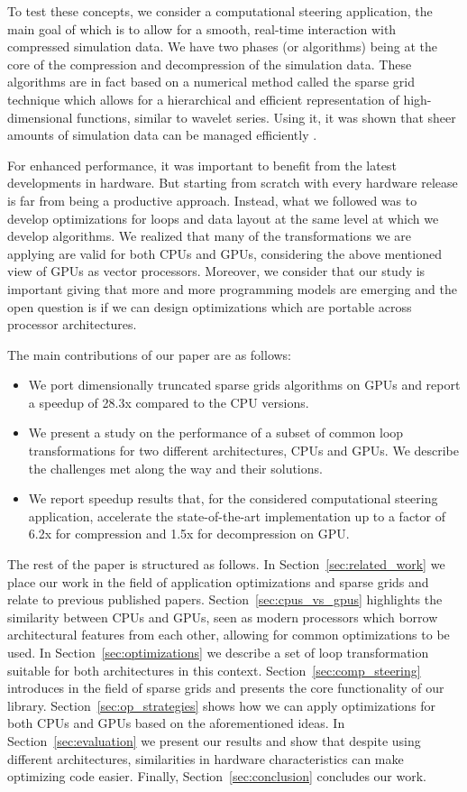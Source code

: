 To test these concepts, we consider a computational steering application, the
main goal of which is to allow for a smooth, real-time interaction with
compressed simulation data. We have two phases (or algorithms) being at the core
of the compression and decompression of the simulation data. These algorithms
are in fact based on a numerical method called the sparse grid technique which
allows for a hierarchical and efficient representation of high-dimensional
functions, similar to wavelet series. Using it, it was shown that sheer amounts
of simulation data can be managed efficiently \cite{Butnaru201156}.

For enhanced performance, it was important to benefit from the latest
developments in hardware. But starting from scratch with every hardware release
is far from being a productive approach. Instead, what we followed was to
develop optimizations for loops and data layout at the same level at which we
develop algorithms. We realized that many of the transformations we are applying
are valid for both CPUs and GPUs, considering the above mentioned view of GPUs
as vector processors. Moreover, we consider that our study is important giving
that more and more programming models are emerging and the open question is if
we can design optimizations which are portable across processor architectures.

The main contributions of our paper are as follows:

\begin{itemize}
  \item We port dimensionally truncated sparse grids algorithms on GPUs and
  report a speedup of 28.3x compared to the CPU versions.
  \item We present a study on the performance of a subset of common loop
  transformations for two different architectures, CPUs and GPUs. We describe
  the challenges met along the way and their solutions.
  \item We report speedup results that, for the considered computational
  steering application, accelerate the state-of-the-art implementation up to a
  factor of 6.2x for compression and 1.5x for decompression on GPU. 
\end{itemize}

The rest of the paper is structured as follows. In
Section~\ref{sec:related_work} we place our work in the field of application
optimizations and sparse grids and relate to previous published papers.
Section~\ref{sec:cpus_vs_gpus} highlights the similarity between CPUs and GPUs,
seen as modern processors which borrow architectural features from each other,
allowing for common optimizations to be used.
In Section~\ref{sec:optimizations} we describe a set of loop transformation
suitable for both architectures in this context. Section~\ref{sec:comp_steering}
introduces in the field of sparse grids and presents the core functionality of
our library. Section~\ref{sec:op_strategies} shows how we can apply
optimizations for both CPUs and GPUs based on the aforementioned ideas. In
Section~\ref{sec:evaluation} we present our results and show that despite using
different architectures, similarities in hardware characteristics can make
optimizing code easier. Finally, Section~\ref{sec:conclusion} concludes our
work.
